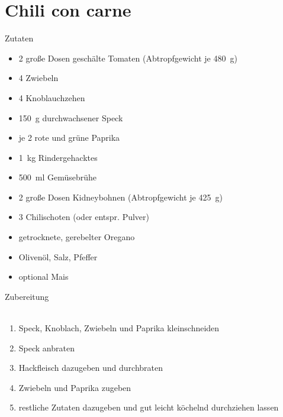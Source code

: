 \section*{Chili con carne}
\ihead{}\ohead{}
\cfoot{}
{\Large Zutaten}
\begin{multicols}{2}
\begin{itemize}
    \item \num{2} große Dosen geschälte Tomaten (Abtropfgewicht je \SI{480}{g})
    \item \num{4} Zwiebeln
    \item \num{4} Knoblauchzehen
    \item \SI{150}{g} durchwachsener Speck
    \item je \num{2} rote und grüne Paprika
    \item \SI{1}{kg} Rindergehacktes
    \item \SI{500}{ml} Gemüsebrühe
    \item \num{2} große Dosen Kidneybohnen (Abtropfgewicht je \SI{425}{g})
    \item \num{3} Chilischoten (oder entspr. Pulver)
    \item getrocknete, gerebelter Oregano
    \item Olivenöl, Salz, Pfeffer
    \item optional Mais
\end{itemize}
\end{multicols}
\noindent
{\Large Zubereitung}\\
\\
\begin{enumerate}
    \item Speck, Knoblach, Zwiebeln und Paprika kleinschneiden
    \item Speck anbraten
    \item Hackfleisch dazugeben und durchbraten
    \item Zwiebeln und Paprika zugeben
    \item restliche Zutaten dazugeben und gut leicht köchelnd durchziehen lassen
\end{enumerate}